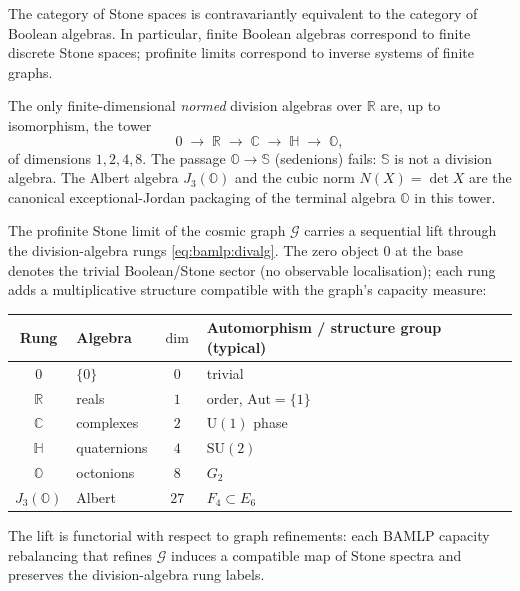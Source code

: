 \begin{theorem}\label{thm:bamlp:stone}
The category of Stone spaces is contravariantly equivalent to the category of
Boolean algebras. In particular, finite Boolean algebras correspond to finite
discrete Stone spaces; profinite limits correspond to inverse systems of finite
graphs.
\end{theorem}

\begin{theorem}\label{thm:bamlp:hurwitz}
The only finite-dimensional \emph{normed} division algebras over $\mathbb{R}$
are, up to isomorphism, the tower
\begin{equation}
  0 \;\longrightarrow\; \mathbb{R} \;\longrightarrow\; \mathbb{C}
  \;\longrightarrow\; \mathbb{H} \;\longrightarrow\; \mathbb{O},
  \label{eq:bamlp:divalg}
\end{equation}
of dimensions $1,2,4,8$. The passage $\mathbb{O}\to\mathbb{S}$ (sedenions)
fails: $\mathbb{S}$ is not a division algebra. The Albert algebra
$J_3(\mathbb{O})$ and the cubic norm $N(X)=\det X$ are the canonical
exceptional-Jordan packaging of the terminal algebra $\mathbb{O}$ in this tower.
\end{theorem}

\begin{postulate}\label{post:bamlp:lift}
The profinite Stone limit of the cosmic graph $\mathcal{G}$ carries a
sequential lift through the division-algebra rungs
\eqref{eq:bamlp:divalg}. The zero object $0$ at the base denotes the trivial
Boolean/Stone sector (no observable localisation); each rung adds a
multiplicative structure compatible with the graph's capacity measure:
\begin{center}
\small
\begin{tabular}{@{}clcl@{}}
\toprule
Rung & Algebra & $\dim$ & Automorphism / structure group (typical) \\
\midrule
$0$ & $\{0\}$ & $0$ & trivial \\
$\mathbb{R}$ & reals & $1$ & order, $\mathrm{Aut}=\{1\}$ \\
$\mathbb{C}$ & complexes & $2$ & $\mathrm{U}(1)$ phase \\
$\mathbb{H}$ & quaternions & $4$ & $\mathrm{SU}(2)$ \\
$\mathbb{O}$ & octonions & $8$ & $G_2$ \\
$J_3(\mathbb{O})$ & Albert & $27$ & $F_4\subset E_6$ \\
\bottomrule
\end{tabular}
\end{center}
The lift is functorial with respect to graph refinements: each BAMLP capacity
rebalancing that refines $\mathcal{G}$ induces a compatible map of Stone
spectra and preserves the division-algebra rung labels.
\end{postulate}

